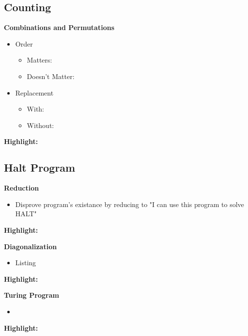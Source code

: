 \documentclass{article}\usepackage{amsmath,amssymb,amsthm,tikz,tkz-graph,color,chngpage,soul,hyperref,csquotes,graphicx,floatrow, listings,polynom}\newcommand*{\QEDB}{\hfill\ensuremath{\square}}\newtheorem*{prop}{Proposition}\renewcommand{\theenumi}{\alph{enumi}}\usepackage[shortlabels]{enumitem}\usepackage[nobreak=true]{mdframed}\usetikzlibrary{matrix,calc}\MakeOuterQuote{"}\usepackage[margin=0.75in]{geometry} \newtheorem{theorem}{Theorem}\newcommand{\Z}{\mathbb Z}\newcommand{\R}{\mathbb R}\newcommand{\Q}{\mathbb Q}\newcommand{\N}{\mathbb N}\newcommand{\x}[1]{\textrm{ #1 }}\newcommand{\pr}{\textrm{Pr}}
\begin{document}
\pagebreak

\subsection*{Counting}
\textbf{Combinations and Permutations}
\begin{itemize}
    \item Order
    \begin{itemize}
        \item Matters:
        \item Doesn't Matter:
    \end{itemize}
    \item Replacement
    \begin{itemize}
        \item With:
        \item Without:
    \end{itemize}
\end{itemize}
\begin{mdframed}
\textbf{Highlight:}
\end{mdframed}

\subsection*{Halt Program}
\textbf{Reduction}
\begin{itemize}
    \item Disprove program's existance by reducing to "I can use this program to solve HALT"
\end{itemize}
\begin{mdframed}
\textbf{Highlight:}
\end{mdframed}
\textbf{Diagonalization}
\begin{itemize}
    \item Listing
\end{itemize}
\begin{mdframed}
\textbf{Highlight:}
\end{mdframed}
\textbf{Turing Program}
\begin{itemize}
    \item 
\end{itemize}
\begin{mdframed}
\textbf{Highlight:}
\end{mdframed}
\end{document}
